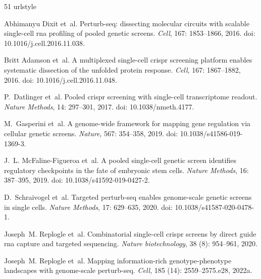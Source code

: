 \documentclass[10pt]{article}
\begin{document}
\begin{thebibliography}{51}
\providecommand{\natexlab}[1]{#1}
\providecommand{\url}[1]{\texttt{#1}}
\expandafter\ifx\csname urlstyle\endcsname\relax
  \providecommand{\doi}[1]{doi: #1}\else
  \providecommand{\doi}{doi: \begingroup \urlstyle{rm}\Url}\fi

Abhimanyu Dixit et~al.
\newblock Perturb-seq: dissecting molecular circuits with scalable single-cell
  rna profiling of pooled genetic screens.
\newblock \emph{Cell}, 167: 1853--1866, 2016.
\newblock \doi{10.1016/j.cell.2016.11.038}.

Britt Adamson et~al.
\newblock A multiplexed single-cell crispr screening platform enables
  systematic dissection of the unfolded protein response.
\newblock \emph{Cell}, 167: 1867--1882, 2016.
\newblock \doi{10.1016/j.cell.2016.11.048}.

P.~Datlinger et~al.
\newblock Pooled crispr screening with single-cell transcriptome readout.
\newblock \emph{Nature Methods}, 14: 297--301, 2017.
\newblock \doi{10.1038/nmeth.4177}.

M.~Gasperini et~al.
\newblock A genome-wide framework for mapping gene regulation via cellular
  genetic screens.
\newblock \emph{Nature}, 567: 354--358, 2019.
\newblock \doi{10.1038/s41586-019-1369-3}.

J.~L. McFaline-Figueroa et~al.
\newblock A pooled single-cell genetic screen identifies regulatory checkpoints
  in the fate of embryonic stem cells.
\newblock \emph{Nature Methods}, 16: 387--395, 2019.
\newblock \doi{10.1038/s41592-019-0427-2}.

D.~Schraivogel et~al.
\newblock Targeted perturb-seq enables genome-scale genetic screens in single
  cells.
\newblock \emph{Nature Methods}, 17: 629--635, 2020.
\newblock \doi{10.1038/s41587-020-0478-1}.

Joseph~M. Replogle et~al.
\newblock Combinatorial single-cell crispr screens by direct guide rna capture
  and targeted sequencing.
\newblock \emph{Nature biotechnology}, 38 (8): 954--961,
  2020.

\bibitem[Replogle et~al.(2022{\natexlab{a}})]{pmid35688146}
Joseph~M. Replogle et~al.
\newblock Mapping information-rich genotype-phenotype landscapes with
  genome-scale perturb-seq.
\newblock \emph{Cell}, 185 (14): 2559--2575.e28,
  2022{\natexlab{a}}.


\end{thebibliography}
\end{document}
